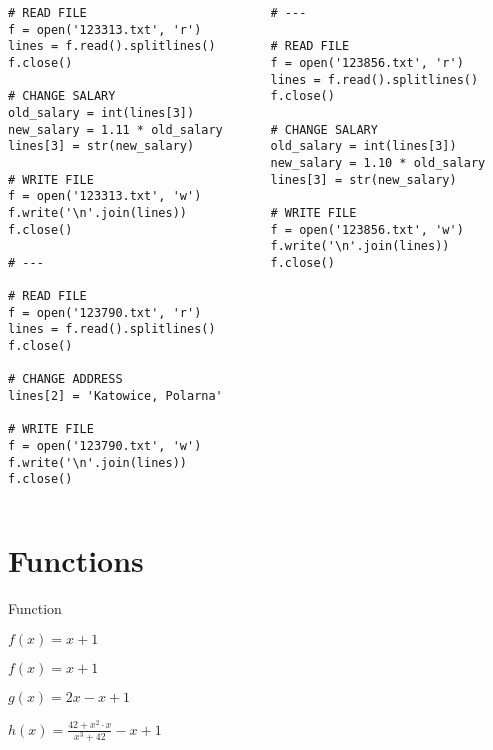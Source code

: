 \documentclass[aspectratio=169]{beamer}
\newcommand{\style}[1]{\ttfamily#1}
\begin{document}
\begin{frame}[fragile,label=longcode]
\begin{columns}
\begin{column}{0.5\textwidth}
\begin{lstlisting}[basicstyle=\style{\tiny}]
# READ FILE
f = open('123313.txt', 'r')
lines = f.read().splitlines()
f.close()

# CHANGE SALARY
old_salary = int(lines[3])
new_salary = 1.11 * old_salary
lines[3] = str(new_salary)

# WRITE FILE
f = open('123313.txt', 'w')
f.write('\n'.join(lines))
f.close()

# ---

# READ FILE
f = open('123790.txt', 'r')
lines = f.read().splitlines()
f.close()

# CHANGE ADDRESS
lines[2] = 'Katowice, Polarna'

# WRITE FILE
f = open('123790.txt', 'w')
f.write('\n'.join(lines))
f.close()
\end{lstlisting}
\end{column}
\begin{column}{0.5\textwidth}
\begin{lstlisting}[basicstyle=\style{\tiny}]
# ---

# READ FILE
f = open('123856.txt', 'r')
lines = f.read().splitlines()
f.close()

# CHANGE SALARY
old_salary = int(lines[3])
new_salary = 1.10 * old_salary
lines[3] = str(new_salary)

# WRITE FILE
f = open('123856.txt', 'w')
f.write('\n'.join(lines))
f.close()
\end{lstlisting}
\end{column}
\end{columns}
\end{frame}

\section{Functions}

\begin{frame}
\centering
\Huge
Function
\end{frame}

\begin{frame}
\centering
\Huge
$f(x) = x + 1$
\end{frame}

\begin{frame}
\centering
\Huge
$f(x) = x + 1$

$g(x) = 2x - x + 1$

$h(x) = \frac{42 + x^2\cdot{}x}{x^3+42} - x + 1$
\end{frame}
\end{document}
